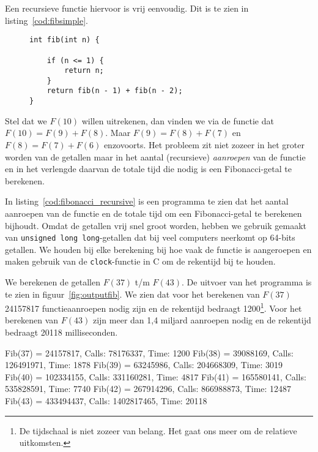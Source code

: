 Een recursieve functie hiervoor is vrij eenvoudig. Dit is te zien in listing~\ref{cod:fibsimple}.

\begin{figure}[!ht]
\begin{lstlisting}[caption=Recursieve functie voor berekenen van Fibonacci-getallen.,label=cod:fibsimple]
int fib(int n) {

    if (n <= 1) {
        return n;
    }
    return fib(n - 1) + fib(n - 2);
}
\end{lstlisting}
\end{figure}

Stel dat we $F(10)$ willen uitrekenen, dan vinden we via de functie dat $F(10)= F(9)+F(8)$. Maar $F(9) =F(8)+F(7)$ en $F(8)=F(7)+F(6)$ enzovoorts. Het probleem zit niet zozeer in het groter worden van de getallen maar in het aantal (recursieve) \textsl{aanroepen} van de functie en in het verlengde daarvan de totale tijd die nodig is een Fibonacci-getal te berekenen.

In listing~\ref{cod:fibonacci_recursive} is een programma te zien dat het aantal aanroepen van de functie en de totale tijd om een Fibonacci-getal te berekenen bijhoudt. Omdat de getallen vrij snel groot worden, hebben we gebruik gemaakt van \texttt{unsigned long long}-getallen dat bij veel computers neerkomt op 64-bits getallen.
We houden bij elke berekening bij hoe vaak de functie is aangeroepen en maken gebruik van de \texttt{clock}-functie in C om de rekentijd bij te houden.


We berekenen de getallen $F(37)$ t/m $F(43)$. De uitvoer van het programma is te zien in figuur~\ref{fig:outputfib}. We zien dat voor het berekenen van $F(37)$ 24157817 functieaanroepen nodig zijn en de rekentijd bedraagt 1200\footnote{De tijdschaal is niet zozeer van belang. Het gaat ons meer om de relatieve uitkomsten.}. Voor het berekenen van $F(43)$ zijn meer dan 1,4 miljard aanroepen nodig en de rekentijd bedraagt 20118 milliseconden.

\begin{dosbox}[title=Uitvoer van een Fibonacci-programma.,label=fig:outputfib]
Fib(37) = 24157817, Calls: 78176337, Time: 1200
Fib(38) = 39088169, Calls: 126491971, Time: 1878
Fib(39) = 63245986, Calls: 204668309, Time: 3019
Fib(40) = 102334155, Calls: 331160281, Time: 4817
Fib(41) = 165580141, Calls: 535828591, Time: 7740
Fib(42) = 267914296, Calls: 866988873, Time: 12487
Fib(43) = 433494437, Calls: 1402817465, Time: 20118
\end{dosbox}


